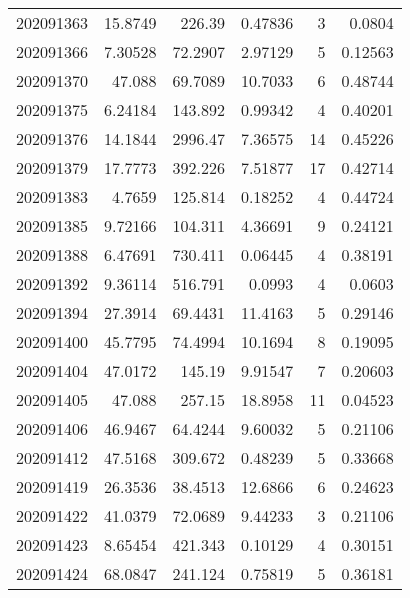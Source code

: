 \begin{tabular}{rrrrrr}
 202091363 &         15.8749  &      226.39   &            0.47836 &           3 & 0.0804  \\
 202091366 &          7.30528 &       72.2907 &            2.97129 &           5 & 0.12563 \\
 202091370 &         47.088   &       69.7089 &           10.7033  &           6 & 0.48744 \\
 202091375 &          6.24184 &      143.892  &            0.99342 &           4 & 0.40201 \\
 202091376 &         14.1844  &     2996.47   &            7.36575 &          14 & 0.45226 \\
 202091379 &         17.7773  &      392.226  &            7.51877 &          17 & 0.42714 \\
 202091383 &          4.7659  &      125.814  &            0.18252 &           4 & 0.44724 \\
 202091385 &          9.72166 &      104.311  &            4.36691 &           9 & 0.24121 \\
 202091388 &          6.47691 &      730.411  &            0.06445 &           4 & 0.38191 \\
 202091392 &          9.36114 &      516.791  &            0.0993  &           4 & 0.0603  \\
 202091394 &         27.3914  &       69.4431 &           11.4163  &           5 & 0.29146 \\
 202091400 &         45.7795  &       74.4994 &           10.1694  &           8 & 0.19095 \\
 202091404 &         47.0172  &      145.19   &            9.91547 &           7 & 0.20603 \\
 202091405 &         47.088   &      257.15   &           18.8958  &          11 & 0.04523 \\
 202091406 &         46.9467  &       64.4244 &            9.60032 &           5 & 0.21106 \\
 202091412 &         47.5168  &      309.672  &            0.48239 &           5 & 0.33668 \\
 202091419 &         26.3536  &       38.4513 &           12.6866  &           6 & 0.24623 \\
 202091422 &         41.0379  &       72.0689 &            9.44233 &           3 & 0.21106 \\
 202091423 &          8.65454 &      421.343  &            0.10129 &           4 & 0.30151 \\
 202091424 &         68.0847  &      241.124  &            0.75819 &           5 & 0.36181 \\

\end{tabular}
